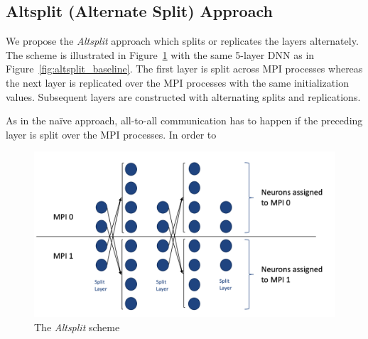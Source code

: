 \subsection{Altsplit (Alternate Split) Approach}
We propose the \emph{Altsplit} approach which splits or replicates the layers 
alternately. The scheme is illustrated in Figure~\ref{fig:altsplit_scheme} with 
the same 5-layer DNN as in Figure~\ref{fig:altsplit_baseline}. The first layer 
is split across MPI processes whereas the next layer is replicated over 
the MPI processes with the same initialization values. Subsequent layers are 
constructed with alternating splits and replications.

As in the na\"{i}ve approach, all-to-all communication has to happen if the 
preceding layer is split over the MPI processes. In order to 

\begin{figure}[H]
    \centerline{\includegraphics[scale=0.60]{altsplit/figs/altsplit.png}}
    \caption{The \emph{Altsplit} scheme}
    \label{fig:altsplit_scheme}
\end{figure}
